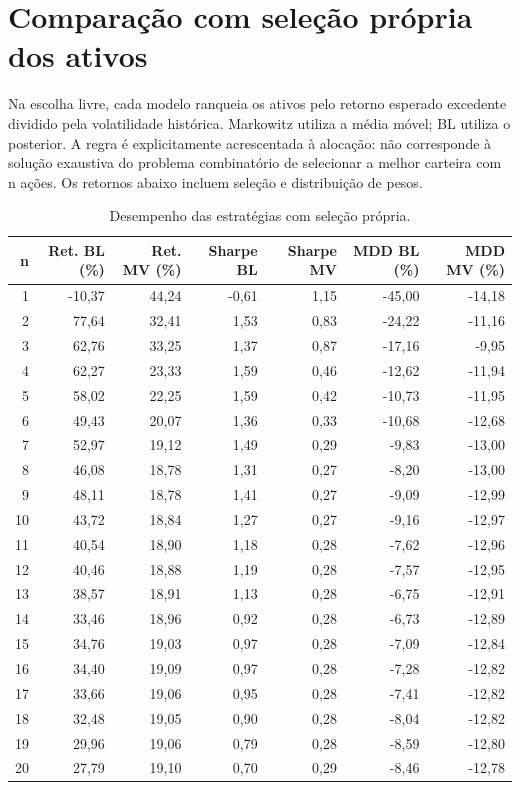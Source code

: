 \section{Comparação com seleção própria dos ativos}
Na escolha livre, cada modelo ranqueia os ativos pelo retorno esperado excedente dividido pela volatilidade histórica. Markowitz utiliza a média móvel; BL utiliza o posterior. A regra é explicitamente acrescentada à alocação: não corresponde à solução exaustiva do problema combinatório de selecionar a melhor carteira com n ações. Os retornos abaixo incluem seleção e distribuição de pesos.

\begin{table}[H]
\centering
\caption{Desempenho das estratégias com seleção própria.}
\label{tab:selecao_propria}
{\footnotesize
\begin{tabular}{@{}rrrrrrr@{}}
\hline
n & Ret. BL (\%) & Ret. MV (\%) & Sharpe BL & Sharpe MV & MDD BL (\%) & MDD MV (\%) \\ \hline
1 & -10,37 & 44,24 & -0,61 & 1,15 & -45,00 & -14,18 \\
2 & 77,64 & 32,41 & 1,53 & 0,83 & -24,22 & -11,16 \\
3 & 62,76 & 33,25 & 1,37 & 0,87 & -17,16 & -9,95 \\
4 & 62,27 & 23,33 & 1,59 & 0,46 & -12,62 & -11,94 \\
5 & 58,02 & 22,25 & 1,59 & 0,42 & -10,73 & -11,95 \\
6 & 49,43 & 20,07 & 1,36 & 0,33 & -10,68 & -12,68 \\
7 & 52,97 & 19,12 & 1,49 & 0,29 & -9,83 & -13,00 \\
8 & 46,08 & 18,78 & 1,31 & 0,27 & -8,20 & -13,00 \\
9 & 48,11 & 18,78 & 1,41 & 0,27 & -9,09 & -12,99 \\
10 & 43,72 & 18,84 & 1,27 & 0,27 & -9,16 & -12,97 \\
11 & 40,54 & 18,90 & 1,18 & 0,28 & -7,62 & -12,96 \\
12 & 40,46 & 18,88 & 1,19 & 0,28 & -7,57 & -12,95 \\
13 & 38,57 & 18,91 & 1,13 & 0,28 & -6,75 & -12,91 \\
14 & 33,46 & 18,96 & 0,92 & 0,28 & -6,73 & -12,89 \\
15 & 34,76 & 19,03 & 0,97 & 0,28 & -7,09 & -12,84 \\
16 & 34,40 & 19,09 & 0,97 & 0,28 & -7,28 & -12,82 \\
17 & 33,66 & 19,06 & 0,95 & 0,28 & -7,41 & -12,82 \\
18 & 32,48 & 19,05 & 0,90 & 0,28 & -8,04 & -12,82 \\
19 & 29,96 & 19,06 & 0,79 & 0,28 & -8,59 & -12,80 \\
20 & 27,79 & 19,10 & 0,70 & 0,29 & -8,46 & -12,78 \\
\hline
\end{tabular}}
\par{}
\end{table}
